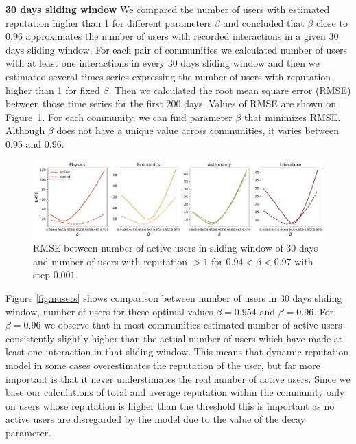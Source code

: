 \textbf{30 days sliding window} We compared the number of users with estimated reputation higher than 1 for different parameters $\beta$ and concluded that $\beta$ close to $0.96$ approximates the number of users with recorded interactions in a given 30 days sliding window. For each pair of communities we calculated number of users with at least one interactions in every 30 days sliding window and then we estimated several times series expressing the number of users with reputation higher than 1 for fixed $\beta$. Then we calculated the root mean square error (RMSE) between those time series for the first 200 days. Values of RMSE are shown on Figure~\ref{fig:rmse}. For each community, we can find parameter $\beta$ that minimizes RMSE. Although $\beta$ does not have a unique value across communities, it varies between 0.95 and 0.96. 


\begin{figure}[h!]
	\centering
	\includegraphics[width=\linewidth]{figures/stackexchange/rmse.pdf}
	\caption{RMSE between number of active users in sliding window of 30 days and number of users with reputation $>1$ for  $0.94< \beta <0.97$ with step $0.001$. }
	\label{fig:rmse}
\end{figure}

Figure \ref{fig:nusers} shows comparison between number of users in 30 days sliding window, number of users for these optimal values $\beta = 0.954$ and $\beta =0.96$. For $\beta = 0.96$ we observe that in most communities estimated number of active users consistently slightly higher than the actual number of users which have made at least one interaction in that sliding window. This means that dynamic reputation model in some cases overestimates the reputation of the user, but far more important is that it never understimates the real number of active users. Since we base our calculations of total and average reputation within the community only on users whose reputation is higher than the threshold this is important as no active users are disregarded by the model due to the value of the decay parameter.

